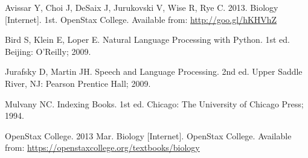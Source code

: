 \begin{thebibliography}{99}
  Avissar Y, Choi J, DeSaix J, Jurukovski V, Wise R, Rye C. 2013. Biology [Internet]. 1st. OpenStax College. Available from: \url{http://goo.gl/hKHVhZ}

Bird S, Klein E, Loper E. Natural Language Processing with Python. 1st ed. Beijing: O’Reilly; 2009.

Jurafsky D, Martin JH. Speech and Language Processing. 2nd ed. Upper Saddle River, NJ: Pearson Prentice Hall; 2009.

Mulvany NC. Indexing Books. 1st ed. Chicago: The University of Chicago Press; 1994.

OpenStax College. 2013 Mar. Biology [Internet]. OpenStax College. Available from: \url{https://openstaxcollege.org/textbooks/biology}
\end{thebibliography}